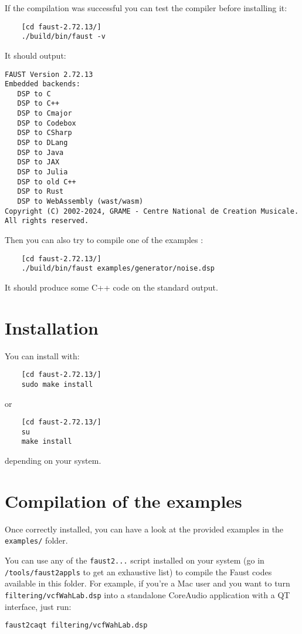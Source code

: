 If the compilation was successful you can test the compiler before installing it:
\begin{lstlisting}
	[cd faust-2.72.13/]
	./build/bin/faust -v
\end{lstlisting}
It should output:
\begin{lstlisting}
FAUST Version 2.72.13
Embedded backends: 
   DSP to C
   DSP to C++
   DSP to Cmajor
   DSP to Codebox
   DSP to CSharp
   DSP to DLang
   DSP to Java
   DSP to JAX
   DSP to Julia
   DSP to old C++
   DSP to Rust
   DSP to WebAssembly (wast/wasm)
Copyright (C) 2002-2024, GRAME - Centre National de Creation Musicale. All rights reserved. 
\end{lstlisting}

Then you can also try to compile one of the examples :
\begin{lstlisting}
	[cd faust-2.72.13/]
	./build/bin/faust examples/generator/noise.dsp
\end{lstlisting}
It should produce some C++ code on the standard output.

\section{Installation}
You can install \faust with:
\begin{lstlisting}
	[cd faust-2.72.13/]
	sudo make install
\end{lstlisting}
or
\begin{lstlisting}
	[cd faust-2.72.13/]
	su
	make install
\end{lstlisting}
depending on your system.

\section{Compilation of the examples}

Once \faust correctly installed, you can have a look at the provided examples in the \lstinline'examples/' folder. 

You can use any of the \lstinline'faust2...' script installed on your system (go in \lstinline'/tools/faust2appls' to get an exhaustive list) to compile the Faust codes available in this folder. For example, if you're a Mac user and you want to turn \lstinline'filtering/vcfWahLab.dsp' into a standalone CoreAudio application with a QT interface, just run:

\lstinline'faust2caqt filtering/vcfWahLab.dsp'

